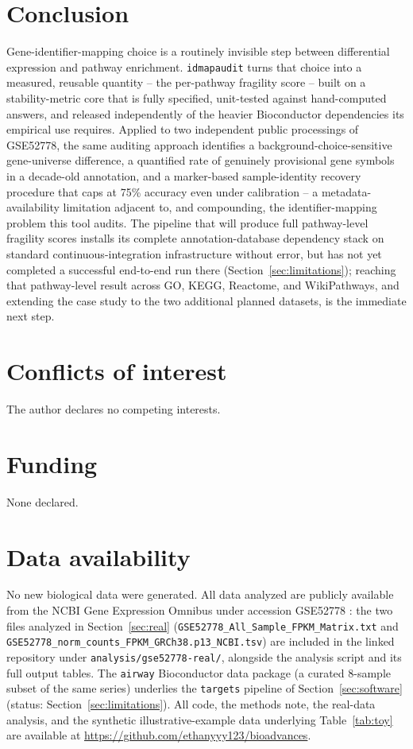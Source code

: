 \documentclass[webpdf,contemporary,large]{oup-authoring-template}
\theoremstyle{thmstyleone}%
\theoremstyle{thmstyletwo}%
\theoremstyle{thmstylethree}%
\begin{document}
\section{Conclusion}\label{sec:conclusion}

Gene-identifier-mapping choice is a routinely invisible step between differential expression and pathway enrichment. \texttt{idmapaudit} turns that choice into a measured, reusable quantity -- the per-pathway fragility score -- built on a stability-metric core that is fully specified, unit-tested against hand-computed answers, and released independently of the heavier Bioconductor dependencies its empirical use requires. Applied to two independent public processings of GSE52778, the same auditing approach identifies a background-choice-sensitive gene-universe difference, a quantified rate of genuinely provisional gene symbols in a decade-old annotation, and a marker-based sample-identity recovery procedure that caps at 75\% accuracy even under calibration -- a metadata-availability limitation adjacent to, and compounding, the identifier-mapping problem this tool audits. The pipeline that will produce full pathway-level fragility scores installs its complete annotation-database dependency stack on standard continuous-integration infrastructure without error, but has not yet completed a successful end-to-end run there (Section~\ref{sec:limitations}); reaching that pathway-level result across GO, KEGG, Reactome, and WikiPathways, and extending the case study to the two additional planned datasets, is the immediate next step.

\section{Conflicts of interest}
The author declares no competing interests.

\section{Funding}
None declared.

\section{Data availability}
No new biological data were generated. All data analyzed are publicly available from the NCBI Gene Expression Omnibus under accession GSE52778 \citep{himes2014rnaseq}: the two files analyzed in Section~\ref{sec:real} (\texttt{GSE52778\_All\_Sample\_FPKM\_Matrix.txt} and \texttt{GSE52778\_norm\_counts\_FPKM\_GRCh38.p13\_NCBI.tsv}) are included in the linked repository under \texttt{analysis/gse52778-real/}, alongside the analysis script and its full output tables. The \texttt{airway} Bioconductor data package (a curated 8-sample subset of the same series) underlies the \texttt{targets} pipeline of Section~\ref{sec:software} (status: Section~\ref{sec:limitations}). All code, the methods note, the real-data analysis, and the synthetic illustrative-example data underlying Table~\ref{tab:toy} are available at \url{https://github.com/ethanyyy123/bioadvances}.
\end{document}
